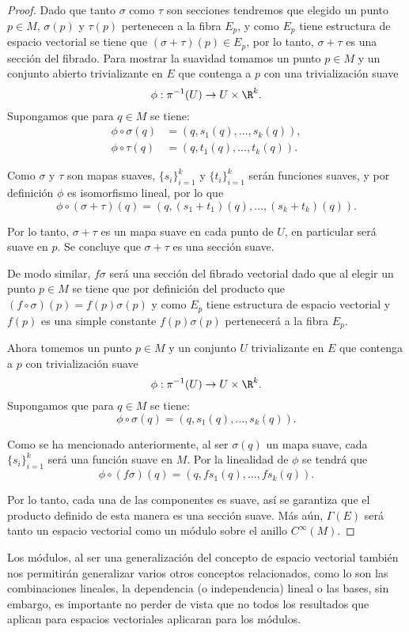 \begin{proof}
	Dado que tanto $\sigma$ como $\tau$ son secciones tendremos que elegido un punto $p \in M$, $\sigma(p)$ y $\tau(p)$ pertenecen a la fibra $E_p$, y como $E_p$ tiene estructura de espacio vectorial se tiene que $(\sigma + \tau)(p) \in E_p$, por lo tanto, $\sigma + \tau$ es una sección del fibrado. Para mostrar la suavidad tomamos un punto $p \in M$ y un conjunto abierto trivializante en $E$ que contenga a $p$ con una trivialización suave
	\[
		\phi: \pi^{-1}(U) \to U \times \R^k.
	\]
	Supongamos que para $q \in M$ se tiene:
	\begin{align*}
		\phi \circ \sigma(q) & = (q, s_1(q), \dots, s_k(q)), \\
		\phi \circ \tau(q)   & = (q, t_1(q), \dots, t_k(q)).
	\end{align*}

	Como $\sigma$ y $\tau$ son mapas suaves, $\{s_i\}_{i=1}^k$ y  $\{t_i\}_{i=1}^k$ serán funciones suaves, y por definición $\phi$ es isomorfismo lineal, por lo que
	\[
		\phi \circ (\sigma + \tau)(q) = (q, (s_1 + t_1)(q), \dots, (s_k + t_k)(q)).
	\]

	Por lo tanto, $\sigma + \tau$ es un mapa suave en cada punto de $U$, en particular será suave en $p$. Se concluye que $\sigma + \tau$ es una sección suave.

	De modo similar, $f\sigma$ será una sección del fibrado vectorial dado que al elegir un punto $p \in M$ se tiene que por definición del producto que $(f \circ \sigma)(p) = f(p)\sigma(p)$ y como $E_p$ tiene estructura de espacio vectorial y $f(p)$ es una simple constante $f(p)\sigma(p)$ pertenecerá a la fibra $E_p$.

	Ahora tomemos un punto $p \in M$ y un conjunto $U$ trivializante en $E$ que contenga a $p$ con trivialización suave
	\[
		\phi: \pi^{-1}(U) \to U \times \R^{k}.
	\]
	Supongamos que para $q \in M$ se tiene:
	\[
		\phi \circ \sigma(q) = (q, s_1(q), \dots, s_k(q)).
	\]

	Como se ha mencionado anteriormente, al ser $\sigma(q)$ un mapa suave, cada $\{s_i\}_{i=1}^k$ será una función suave en $M$. Por la linealidad de $\phi$ se tendrá que
	\[
		\phi \circ (f \sigma)(q) = (q, fs_1(q),\dots, fs_k(q)).
	\]

	Por lo tanto, cada una de las componentes es suave, así se garantiza que el producto definido de esta manera es una sección suave. Más aún, $\Gamma(E)$ será tanto un espacio vectorial como un módulo sobre el anillo $C^{\infty}(M)$.
\end{proof}

Los módulos, al ser una generalización del concepto de espacio vectorial también nos permitirán generalizar varios otros conceptos relacionados, como lo son las combinaciones lineales, la dependencia (o independencia) lineal o las bases, sin embargo, es importante no perder de vista que no todos los resultados que aplican para espacios vectoriales aplicaran para los módulos.

